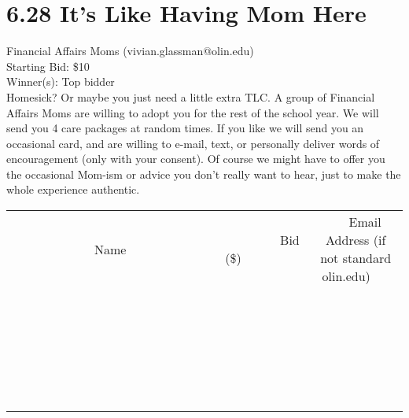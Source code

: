 \documentclass[11pt]{article}
\begin{document}
\section*{6.28 It's Like Having Mom Here}
Financial Affairs Moms (vivian.glassman@olin.edu) \\
Starting Bid: \$10 \\
Winner(s): 
Top bidder \\
Homesick?  Or maybe you just need a little extra TLC.  A group of Financial Affairs Moms are willing to adopt you for the rest of the school year.  We will send you 4 care packages at random times.  If you like we will send you an occasional card, and are willing to e-mail, text, or personally deliver words of encouragement (only with your consent).  Of course we might have to offer you the occasional Mom-ism or advice you don’t really want to hear, just to make the whole experience authentic. \\[6ex]
\begin{tabular}{c c c}
~~~~~~~~~~~~~Name~~~~~~~~~~~~~ & ~~~~~~~~~Bid (\$)~~~~~~~~~ & ~~~Email Address (if not standard olin.edu)~~~ \\
 & & \\
\hline
 & & \\
\hline
 & & \\
\hline
 & & \\
\hline
 & & \\
\hline
 & & \\
\hline
 & & \\
\hline
 & & \\
\hline
 & & \\
\hline
 & & \\
\hline
 & & \\
\hline
 & & \\
\hline
 & & \\
\hline
 & & \\
\hline
 & & \\
\hline
 & & \\
\hline
 & & \\
\hline
 & & \\
\hline
 & & \\
\hline
 & & \\
\hline
 & & \\
\hline
 & & \\
\hline
 & & \\
\hline
 & & \\
\hline
 & & \\
\hline
 & & \\
\hline
\end{tabular}
\clearpage
\end{document}
